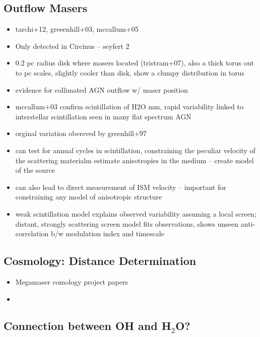 \subsection{Outflow Masers}
\label{sub:h2o_outflows}

\begin{itemize}
\item tarchi+12, greeenhill+03, mccallum+05
\item Only detected in Circinus -- seyfert 2 
\item 0.2 pc radius disk where masers located (tristram+07), also a thick torus out to pc scales, slightly cooler than disk, show a clumpy distribution in torus
\item evidence for collimated AGN outflow w/ maser position
\item mccallum+03 confirm scintillation of H2O mm, rapid variability linked to interstellar scintillation seen in many flat spectrum AGN
\item orginal variation obersved by greenhill+97
\item can test for annual cycles in scintillation, constraining the peculiar velocity of the scattering materialm estimate anisotropies in the medium -- create model of the source
\item can also lead to direct measurement of ISM velocity -- important for constraining any model of anisotropic structure
\item weak scintillation model explains observed variability assuming a local screen; distant, strongly scattering screen model fits observations, shows unseen anti-correlation b/w modulation index and timescale
\end{itemize}

\subsection{Cosmology: Distance Determination}
\label{sub:h2o_cosmo}

\begin{itemize}
\item Megamaser comology project papers
\item 
\end{itemize}

\subsection{Connection between OH and H$_2$O?}
\label{sec:oh_and_h2o}

